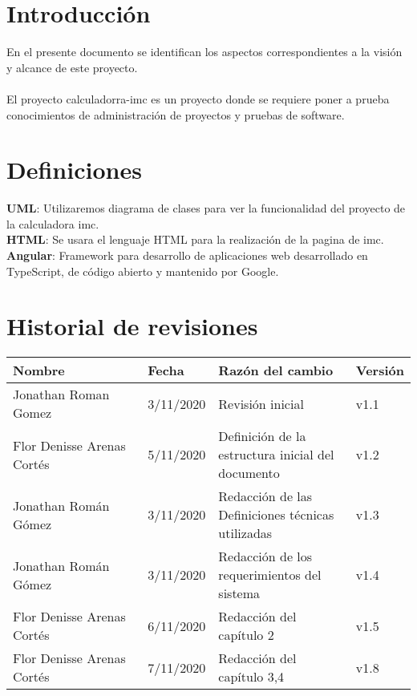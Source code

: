 \documentclass[12pt,a4paper]{book}
\date{\today}
\begin{document}
 	

\tableofcontents
\newpage

\section{Introducción}
\vspace{0.5 cm}
En el presente documento se identifican los aspectos correspondientes a la visión y alcance de este proyecto.\\
\\ El proyecto calculadorra-imc es un proyecto donde se requiere poner a prueba conocimientos de administración de proyectos y pruebas de software.
		
\section{Definiciones}
\vspace{0.5 cm}
\textbf {UML}: Utilizaremos diagrama de clases para ver la funcionalidad del proyecto de la calculadora imc.\\

\textbf {HTML}: Se usara el lenguaje HTML para la realización de la pagina de imc.\\

\textbf {Angular}: Framework para desarrollo de aplicaciones web desarrollado en TypeScript, de código abierto y mantenido por Google.\\

\section{Historial de revisiones}
\vspace{0.5 cm}
\begin{table}[h!]
\centering
\begin{tabular}{|p{0.35\linewidth}|p{0.15\linewidth}|p{0.35\linewidth}|p{0.15\linewidth}|}
\hline
\textbf{Nombre}&\textbf{Fecha}&\textbf{Razón del cambio}&\textbf{Versión}
\\\hline
Jonathan Roman Gomez&3/11/2020&Revisión inicial&v1.1\\\hline
Flor Denisse Arenas Cortés &5/11/2020&Definición de la estructura inicial del documento&v1.2\\\hline
Jonathan Román Gómez&3/11/2020&Redacción de las Definiciones técnicas utilizadas&v1.3\\\hline
Jonathan Román Gómez&3/11/2020&Redacción de los requerimientos del sistema&v1.4\\\hline
Flor Denisse Arenas Cortés&6/11/2020&Redacción del capítulo 2&v1.5\\\hline
Flor Denisse Arenas Cortés&7/11/2020&Redacción del capítulo 3,4 &v1.8\\\hline
\end{tabular}
\end{table}
\end{document}
